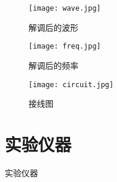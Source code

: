 \documentclass[../main]{subfiles}
\begin{document}
\begin{figure}[htbp]
	\centering
	\texttt{[image: wave.jpg]}
	\caption{解调后的波形}
	\label{fig:解调后的波形}
\end{figure}

\begin{figure}[htbp]
	\centering
	\texttt{[image: freq.jpg]}
	\caption{解调后的频率}
	\label{fig:解调后的频率}
\end{figure}

\begin{figure}[htbp]
	\centering
	\texttt{[image: circuit.jpg]}
	\caption{接线图}
	\label{fig:接线图}
\end{figure}

\section{实验仪器}%
\label{sec:\arabic{chapter}实验仪器}

\begin{table}[htbp]
	\centering
	\caption{实验仪器}
	\label{tab:\arabic{chapter}实验仪器}
\end{table}
\end{document}
